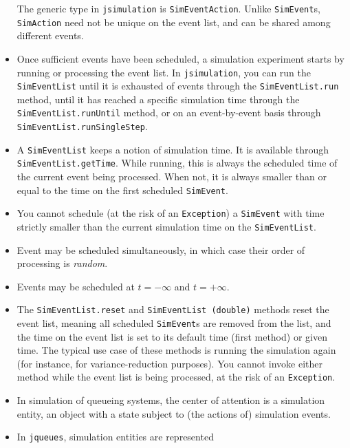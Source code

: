 \documentclass[12pt]{book}
\begin{document}
\begin{itemize}
        The generic type in \lstinline|jsimulation| is \lstinline|SimEventAction|.
        Unlike \lstinline|SimEvent|s, \lstinline|SimAction| need not be unique
          on the event list, and can be shared among different events.
  \item Once sufficient events have been scheduled,
          a simulation experiment starts by running or processing
          the event list.
        In \lstinline|jsimulation|,
          you can run the \lstinline|SimEventList| until it is exhausted
          of events through the \lstinline|SimEventList.run| method,
          until it has reached a specific simulation time
          through the \lstinline|SimEventList.runUntil| method,
          or on an event-by-event basis through \lstinline|SimEventList.runSingleStep|.
  \item A \lstinline|SimEventList| keeps a notion of simulation time.
        It is available through \lstinline|SimEventList.getTime|.
        While running,
          this is always the scheduled time of the current event being processed.
        When not, it is always smaller than or equal to the time
          on the first scheduled \lstinline|SimEvent|.
  \item You cannot schedule (at the risk of an \lstinline|Exception|)
          a \lstinline|SimEvent| with time
          strictly smaller than the current simulation time
          on the \lstinline|SimEventList|.
  \item Event may be scheduled simultaneously,
          in which case their order of processing is {\em random}.
  \item Events may be scheduled at $t=-\infty$ and $t=+\infty$.
  \item The \lstinline|SimEventList.reset| and \lstinline|SimEventList (double)|
          methods reset the event list,
          meaning all scheduled \lstinline|SimEvent|s are removed from the list,
          and the time on the event list is set to its default time (first method)
          or given time.
        The typical use case of these methods is running the simulation again
          (for instance, for variance-reduction purposes).
        You cannot invoke either method while the event list is being processed,
          at the risk of an \lstinline|Exception|.
  \item In simulation of queueing systems,
          the center of attention is a simulation entity,
          an object with a state subject to (the actions of) simulation events.
  \item In \lstinline|jqueues|, simulation entities are represented

\end{itemize}
\end{document}
